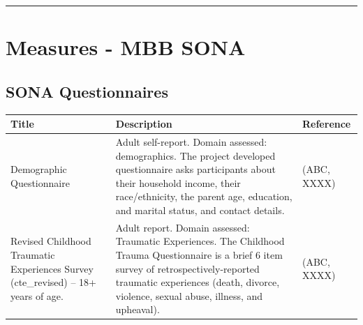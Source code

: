 \documentclass[]{book}
\begin{document}
\begin{center}\rule{0.5\linewidth}{0.5pt}\end{center}

\hypertarget{measures---mbb-sona}{%
\section{Measures - MBB SONA}\label{measures---mbb-sona}}

\hypertarget{sona-questionnaires}{%
\subsection{SONA Questionnaires}\label{sona-questionnaires}}

\begin{longtable}[]{@{}lll@{}}
\toprule
\begin{minipage}[b]{0.32\columnwidth}\raggedright
Title\strut
\end{minipage} & \begin{minipage}[b]{0.32\columnwidth}\raggedright
Description\strut
\end{minipage} & \begin{minipage}[b]{0.27\columnwidth}\raggedright
Reference\strut
\end{minipage}\tabularnewline
\midrule
\endhead
\begin{minipage}[t]{0.32\columnwidth}\raggedright
Demographic Questionnaire\strut
\end{minipage} & \begin{minipage}[t]{0.32\columnwidth}\raggedright
Adult self-report. Domain assessed: demographics. The project developed questionnaire asks participants about their household income, their race/ethnicity, the parent age, education, and marital status, and contact details.\strut
\end{minipage} & \begin{minipage}[t]{0.27\columnwidth}\raggedright
(ABC, XXXX)\strut
\end{minipage}\tabularnewline
\begin{minipage}[t]{0.32\columnwidth}\raggedright
Revised Childhood Traumatic Experiences Survey (cte\_revised) -- 18+ years of age.\strut
\end{minipage} & \begin{minipage}[t]{0.32\columnwidth}\raggedright
Adult report. Domain assessed: Traumatic Experiences. The Childhood Trauma Questionnaire is a brief 6 item survey of retrospectively-reported traumatic experiences (death, divorce, violence, sexual abuse, illness, and upheaval).\strut
\end{minipage} & \begin{minipage}[t]{0.27\columnwidth}\raggedright
(ABC, XXXX)\strut
\end{minipage}\tabularnewline
\bottomrule
\end{longtable}
\end{document}
